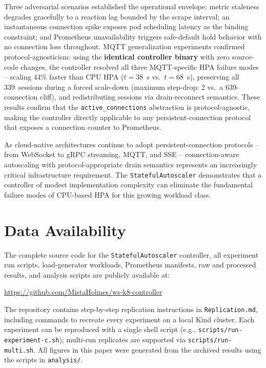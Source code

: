 \documentclass[twocolumn]{svjour3}
\begin{document}
Three adversarial scenarios established the operational envelope: metric staleness degrades
gracefully to a reaction lag bounded by the scrape interval; an instantaneous connection spike
exposes pod scheduling latency as the binding constraint; and Prometheus unavailability
triggers safe-default hold behavior with no connection loss throughout. MQTT generalization
experiments confirmed protocol-agnosticism: using the \textbf{identical controller binary} with
zero source-code changes, the controller resolved all three MQTT-specific HPA failure modes
-- scaling 44\% faster than CPU HPA ($t = 38$~s vs.\ $t = 68$~s), preserving all 339~sessions
during a forced scale-down (maximum step-drop: 2 vs.\ a 639-connection cliff), and
redistributing sessions via drain-reconnect semantics. These results confirm that the
\texttt{active\_connections} abstraction is protocol-agnostic, making the controller directly
applicable to any persistent-connection protocol that exposes a connection counter to
Prometheus.

As cloud-native architectures continue to adopt persistent-connection protocols -- from
WebSocket to gRPC streaming, MQTT, and SSE -- connection-aware autoscaling with
protocol-appropriate drain semantics represents an increasingly critical infrastructure
requirement. The \texttt{StatefulAutoscaler} demonstrates that a controller of modest
implementation complexity can eliminate the fundamental failure modes of CPU-based HPA
for this growing workload class.



\section*{Data Availability}

The complete source code for the \texttt{StatefulAutoscaler} controller, all experiment run
scripts, load-generator workloads, Prometheus manifests, raw and processed results, and
analysis scripts are publicly available at:

\begin{center}
\url{https://github.com/MistaHolmes/ws-k8-controller}
\end{center}

The repository contains step-by-step replication instructions in \texttt{Replication.md},
including commands to recreate every experiment on a local Kind cluster. Each experiment
can be reproduced with a single shell script (e.g., \texttt{scripts/run-experiment-c.sh});
multi-run replicates are supported via \texttt{scripts/run-multi.sh}. All figures in this paper
were generated from the archived results using the scripts in \texttt{analysis/}.
\end{document}
